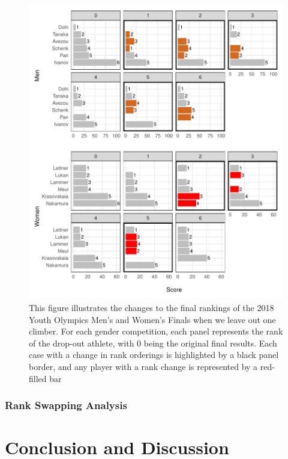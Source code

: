 \documentclass[12pt]{article}
\begin{document}
\begin{figure}

{\centering \includegraphics{draft_files/figure-latex/unnamed-chunk-26-1} 

}

\caption{This figure illustrates the changes to the final rankings of the 2018 Youth Olympics Men's and Women's Finals when we leave out one climber. For each gender competition, each panel represents the rank of the drop-out athlete, with 0 being the original final results. Each case with a change in rank orderings is highlighted by a black panel border, and any player with a rank change is represented by a red-filled bar}\label{fig:unnamed-chunk-26}
\end{figure}

\hypertarget{rank-swapping-analysis}{%
\subsubsection{Rank Swapping Analysis}\label{rank-swapping-analysis}}

\hypertarget{conclusion-and-discussion}{%
\section{Conclusion and Discussion}\label{conclusion-and-discussion}}
\end{document}
